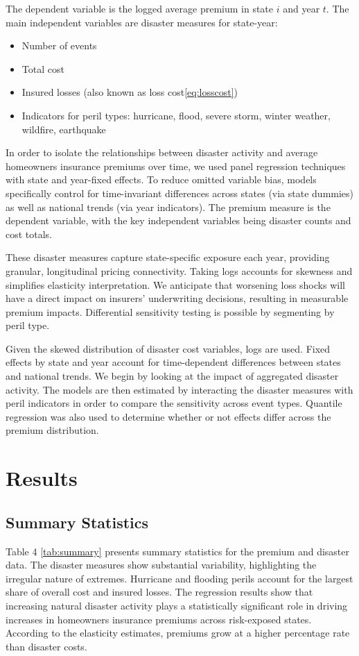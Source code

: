 \documentclass[12pt]{article}
\begin{document}
The dependent variable is the logged average premium in state $i$ and year $t$. The main independent variables are disaster measures 
for state-year:

\begin{itemize} 
    \item Number of events 
    \item Total cost 
    \item Insured losses (also known as loss cost\ref{eq:losscost})
    \item Indicators for peril types: hurricane, flood, severe storm, winter weather, wildfire, earthquake 
\end{itemize}


In order to isolate the relationships between disaster activity and average homeowners insurance premiums over time, we used 
panel regression techniques with state and year-fixed effects. To reduce omitted variable bias, models specifically control for 
time-invariant differences across states (via state dummies) as well as national trends (via year indicators). The premium measure is 
the dependent variable, with the key independent variables being disaster counts and cost totals.

These disaster measures capture state-specific exposure each year, providing granular, longitudinal pricing connectivity. Taking logs 
accounts for skewness and simplifies elasticity interpretation. We anticipate that worsening loss shocks will have a direct impact on 
insurers' underwriting decisions, resulting in measurable premium impacts. Differential sensitivity testing is possible by segmenting 
by peril type.

Given the skewed distribution of disaster cost variables, logs are used. Fixed effects by state and year account for time-dependent 
differences between states and national trends. We begin by looking at the impact of aggregated disaster activity. The models are then 
estimated by interacting the disaster measures with peril indicators in order to compare the sensitivity across event types. Quantile 
regression was also used to determine whether or not effects differ across the premium distribution.


\section{Results}
\label{sec:resu}
\subsection{Summary Statistics}
Table 4 \ref{tab:summary} presents summary statistics for the premium and disaster data. The disaster measures show substantial variability, 
highlighting the irregular nature of extremes. Hurricane and flooding perils account for the largest share of overall cost and 
insured losses. The regression results show that increasing natural disaster activity plays a statistically significant role in 
driving increases in homeowners insurance premiums across risk-exposed states. According to the elasticity estimates, premiums grow 
at a higher percentage rate than disaster costs.
\end{document}
